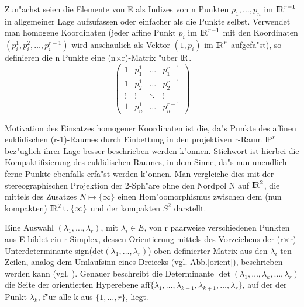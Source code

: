 Zun"achst seien die Elemente von E als Indizes von n Punkten
$p_1,\ldots,p_n$ im $\R^{r-1}$ in allgemeiner Lage aufzufassen oder einfacher
als die Punkte selbst. Verwendet man homogene Koordinaten {(jeder affine Punkt
$p_i$ im $\R^{r-1}$ mit den Koordinaten $(p_i^1,p_i^2,\ldots,p_i^{r-1})$ wird
anschaulich als Vektor $(1,p_i)$ im $\R^r$ aufgefa"st)}, so definieren die n
Punkte eine (n$\times$r)-Matrix "uber $\R$.
$$\left(\begin{array}{cccc}
        1 & p_1^1 & \ldots & p_1^{r-1} \\
        1 & p_2^1 & \ldots & p_2^{r-1} \\
        \vdots & \vdots & \ddots & \vdots \\
        1 & p_n^1 & \ldots & p_n^{r-1} \end{array}\right)$$

{\scsi
Motivation des Einsatzes homogener Koordinaten ist die, da"s Punkte des
affinen euklidischen (r-1)-Raumes durch Einbettung in den projektiven r-Raum
$\P^r$ bez"uglich ihrer Lage besser beschrieben werden k"onnen. Stichwort
ist hierbei die Kompaktifizierung des euklidischen Raumes, in dem Sinne,
da"s nun unendlich ferne Punkte ebenfalls erfa"st werden k"onnen. Man
vergleiche dies mit der stereographischen Projektion der 2-Sph"are ohne den
Nordpol N auf $\R^2$, die mittels des Zusatzes $N \mapsto \{\infty\}$ einen
Hom"oomorphismus zwischen dem (nun kompakten) $\R^2\cup\{\infty\}$ und der
kompakten $S^2$ darstellt.
}

Eine Auswahl $(\lambda_1,\ldots,\lambda_r)$, mit $\lambda_i\in E$, von r
paarweise verschiedenen Punkten aus E bildet ein r-Simplex, dessen
Orientierung mittels des Vorzeichens der (r$\times$r)-Unterdeterminante
sign(det$(\lambda_1,\ldots,\lambda_r)$) oben definierter Matrix aus den
$\lambda_i$-ten Zeilen, analog dem Umlaufsinn eines Dreiecks (vgl.
Abb.\ref{orient}), beschrieben werden kann (vgl. \cite{BoEg:91}).
Genauer beschreibt die Determinante
$\det(\lambda_1,\ldots,\lambda_k,\ldots,\lambda_r)$ die Seite der
orientierten Hyperebene
$\mbox{aff}\{\lambda_1,\ldots,\lambda_{k-1},\lambda_{k+1},\ldots,\lambda_r\}$,
auf der der Punkt $\lambda_k$, f"ur alle k aus $\{1,\ldots,r\}$, liegt.

